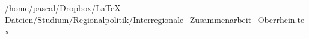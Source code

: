 /home/pascal/Dropbox/LaTeX-Dateien/Studium/Regionalpolitik/Interregionale_Zusammenarbeit_Oberrhein.tex